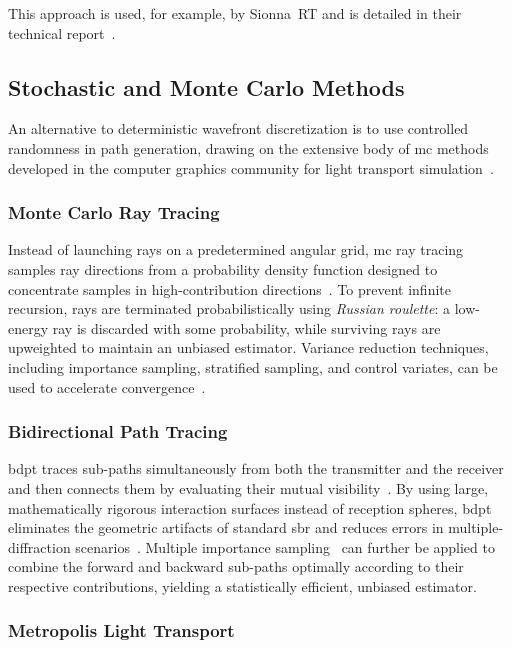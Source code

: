 This approach is used, for example, by Sionna~RT and is detailed in their technical report~.

\subsection{Stochastic and Monte Carlo Methods}

An alternative to deterministic wavefront discretization is to use controlled randomness in path generation, drawing on the extensive body of \gls{mc} methods developed in the computer graphics community for light transport simulation~.

\subsubsection{Monte Carlo Ray Tracing}

Instead of launching rays on a predetermined angular grid, \gls{mc} ray tracing samples ray directions from a probability density function designed to concentrate samples in high-contribution directions~. To prevent infinite recursion, rays are terminated probabilistically using \emph{Russian roulette}: a low-energy ray is discarded with some probability, while surviving rays are upweighted to maintain an unbiased estimator. Variance reduction techniques, including importance sampling, stratified sampling, and control variates, can be used to accelerate convergence~.

\subsubsection{Bidirectional Path Tracing}

\Gls{bdpt} traces sub-paths simultaneously from both the transmitter and the receiver and then connects them by evaluating their mutual visibility~. By using large, mathematically rigorous interaction surfaces instead of reception spheres, \gls{bdpt} eliminates the geometric artifacts of standard \gls{sbr} and reduces errors in multiple-diffraction scenarios~. Multiple importance sampling~ can further be applied to combine the forward and backward sub-paths optimally according to their respective contributions, yielding a statistically efficient, unbiased estimator.

\subsubsection{Metropolis Light Transport}

